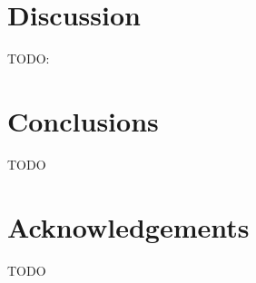 \documentclass[10pt,twocolumn]{article}
\begin{document}
\section{Discussion}
\label{sec:discussion}

TODO: \cite{melax00}

\section{Conclusions}
\label{sec:conclusions}

TODO

\section{Acknowledgements}

TODO

%
%





\end{document}
